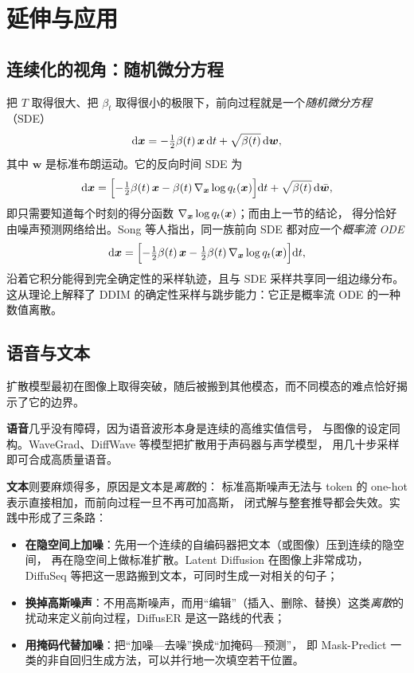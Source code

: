 \section{延伸与应用}

\subsection{连续化的视角：随机微分方程}

把 $T$ 取得很大、把 $\beta_t$ 取得很小的极限下，前向过程就是一个\emph{随机微分方程}（SDE）
\begin{equation}
  \mathrm{d}\bm{x} = -\tfrac{1}{2}\beta(t)\,\bm{x}\,\mathrm{d}t+\sqrt{\beta(t)}\,\mathrm{d}\bm{w},
  \label{eq:forward-sde}
\end{equation}
其中 $\bm{w}$ 是标准布朗运动。它的反向时间 SDE 为
\begin{equation}
  \mathrm{d}\bm{x}=\Bigl[-\tfrac{1}{2}\beta(t)\,\bm{x}-\beta(t)\,\nabla_{\bm{x}}\log q_t(\bm{x})\Bigr]\mathrm{d}t
  +\sqrt{\beta(t)}\,\mathrm{d}\bar{\bm{w}},
  \label{eq:reverse-sde}
\end{equation}
即只需要知道每个时刻的得分函数 $\nabla_{\bm{x}}\log q_t(\bm{x})$；而由上一节的结论，
得分恰好由噪声预测网络给出。Song 等人指出，同一族前向 SDE 都对应一个\emph{概率流 ODE}
\begin{equation}
  \mathrm{d}\bm{x}=\Bigl[-\tfrac{1}{2}\beta(t)\,\bm{x}-\tfrac{1}{2}\beta(t)\,\nabla_{\bm{x}}\log q_t(\bm{x})\Bigr]\mathrm{d}t,
  \label{eq:pf-ode}
\end{equation}
沿着它积分能得到完全确定性的采样轨迹，且与 SDE 采样共享同一组边缘分布\cite{song2021sde}。
这从理论上解释了 DDIM 的确定性采样与跳步能力：它正是概率流 ODE 的一种数值离散。

\subsection{语音与文本}

扩散模型最初在图像上取得突破，随后被搬到其他模态，而不同模态的难点恰好揭示了它的边界。

\textbf{语音}几乎没有障碍，因为语音波形本身是连续的高维实值信号，
与图像的设定同构。WaveGrad、DiffWave 等模型把扩散用于声码器与声学模型，
用几十步采样即可合成高质量语音\cite{chen2021wavegrad}。

\textbf{文本}则要麻烦得多，原因是文本是\emph{离散}的：
标准高斯噪声无法与 token 的 one-hot 表示直接相加，而前向过程一旦不再可加高斯，
闭式解与整套推导都会失效。实践中形成了三条路：

\begin{itemize}
  \item \textbf{在隐空间上加噪}：先用一个连续的自编码器把文本（或图像）压到连续的隐空间，
        再在隐空间上做标准扩散。Latent Diffusion 在图像上非常成功，
        DiffuSeq 等把这一思路搬到文本，可同时生成一对相关的句子\cite{rombach2022ldm}；
  \item \textbf{换掉高斯噪声}：不用高斯噪声，而用“编辑”（插入、删除、替换）这类\emph{离散}的
        扰动来定义前向过程，DiffusER 是这一路线的代表；
  \item \textbf{用掩码代替加噪}：把“加噪—去噪”换成“加掩码—预测”，
        即 Mask-Predict 一类的非自回归生成方法，可以并行地一次填空若干位置\cite{ghazvininejad2019mask}。
\end{itemize}

